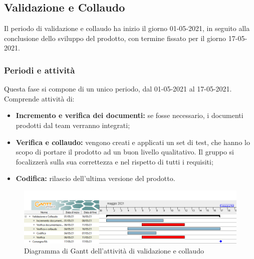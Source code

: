 \subsection{Validazione e Collaudo}
Il periodo di validazione e collaudo ha inizio il giorno 01-05-2021, in seguito alla conclusione dello sviluppo del prodotto, con termine fissato per il giorno 17-05-2021.
\subsubsection{Periodi e attività}
Questa fase si compone di un unico periodo, dal 01-05-2021 al 17-05-2021. Comprende attività di:
\begin{itemize}
	\item \textbf{Incremento e verifica dei documenti:} se fosse necessario, i documenti prodotti dal team verranno integrati;
	\item \textbf{Verifica e collaudo:} vengono creati e applicati un set di test, che hanno lo scopo di portare il prodotto ad un buon livello qualitativo. Il gruppo si focalizzerà sulla sua correttezza e nel rispetto di tutti i requisiti;
	\item \textbf{Codifica:} rilascio dell'ultima versione del prodotto.
\end{itemize}
\begin{figure}[h]
	\centering
	\includegraphics[width=\linewidth]{Images/GanttPianificazioneValidazioneCollaudo.PNG}
	\caption{Diagramma di Gantt dell'attività di validazione e collaudo}
\end{figure}


